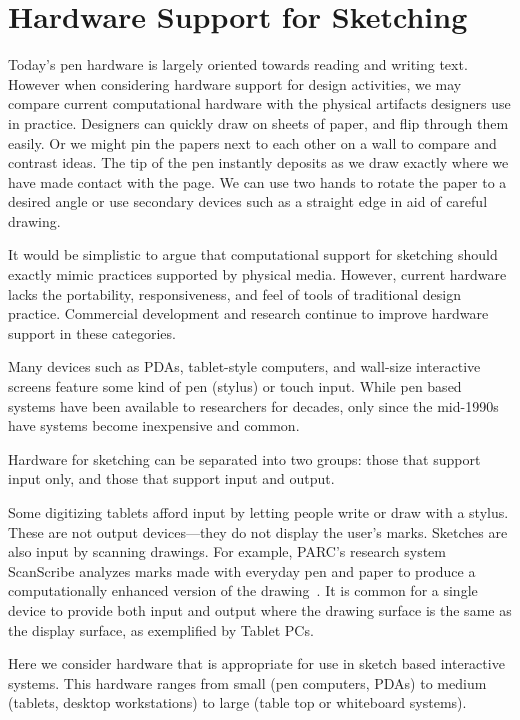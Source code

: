 \newpage
\chapter{Hardware Support for Sketching}
\label{sec:hardware}

Today's pen hardware is largely oriented towards reading and writing
text. However when considering hardware support for design activities,
we may compare current computational hardware with the physical
artifacts designers use in practice. Designers can quickly draw on
sheets of paper, and flip through them easily. Or we might pin the
papers next to each other on a wall to compare and contrast ideas. The
tip of the pen instantly deposits as we draw exactly where we have
made contact with the page. We can use two hands to rotate the paper
to a desired angle or use secondary devices such as a straight edge in
aid of careful drawing.

It would be simplistic to argue that computational support for
sketching should exactly mimic practices supported by physical media.
However, current hardware lacks the portability, responsiveness, and
feel of tools of traditional design practice. Commercial development
and research continue to improve hardware support in these categories.

Many devices such as PDAs, tablet-style computers, and wall-size
interactive screens feature some kind of pen (stylus) or touch
input. While pen based systems have been available to researchers for
decades, only since the mid-1990s have systems become inexpensive and
common.

Hardware for sketching can be separated into two groups: those that
support input only, and those that support input and output.

Some digitizing tablets afford input by letting people write or draw
with a stylus. These are not output devices---they do not display the
user's marks. Sketches are also input by scanning drawings. For
example, PARC's research system ScanScribe analyzes marks made with
everyday pen and paper to produce a computationally enhanced version
of the drawing~\cite{saund-scanscribe}. It is common for a single
device to provide both input and output where the drawing surface is
the same as the display surface, as exemplified by Tablet PCs.

Here we consider hardware that is appropriate for use in sketch based
interactive systems. This hardware ranges from small (pen computers,
PDAs) to medium (tablets, desktop workstations) to large (table top or
whiteboard systems). 


